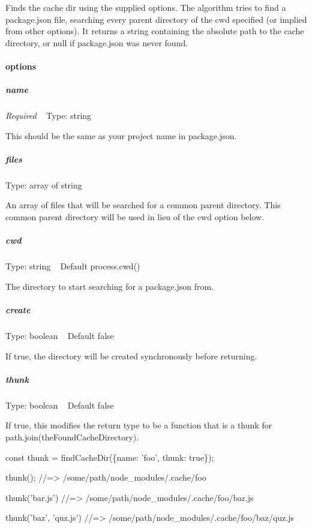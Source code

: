Finds the cache dir using the supplied options. The algorithm tries to find a {\ttfamily package.\+json} file, searching every parent directory of the {\ttfamily cwd} specified (or implied from other options). It returns a {\ttfamily string} containing the absolute path to the cache directory, or {\ttfamily null} if {\ttfamily package.\+json} was never found.

\paragraph*{options}

\subparagraph*{name}

{\itshape Required} ~\newline
Type\+: {\ttfamily string}

This should be the same as your project name in {\ttfamily package.\+json}.

\subparagraph*{files}

Type\+: {\ttfamily array} of {\ttfamily string}

An array of files that will be searched for a common parent directory. This common parent directory will be used in lieu of the {\ttfamily cwd} option below.

\subparagraph*{cwd}

Type\+: {\ttfamily string} ~\newline
Default {\ttfamily process.\+cwd()}

The directory to start searching for a {\ttfamily package.\+json} from.

\subparagraph*{create}

Type\+: {\ttfamily boolean} ~\newline
Default {\ttfamily false}

If {\ttfamily true}, the directory will be created synchronously before returning.

\subparagraph*{thunk}

Type\+: {\ttfamily boolean} ~\newline
Default {\ttfamily false}

If {\ttfamily true}, this modifies the return type to be a function that is a thunk for {\ttfamily path.\+join(the\+Found\+Cache\+Directory)}.


\begin{DoxyCode}
const thunk = findCacheDir(\{name: 'foo', thunk: true\});

thunk();
//=> /some/path/node\_modules/.cache/foo

thunk('bar.js')
//=> /some/path/node\_modules/.cache/foo/bar.js

thunk('baz', 'quz.js')
//=> /some/path/node\_modules/.cache/foo/baz/quz.js
\end{DoxyCode}


